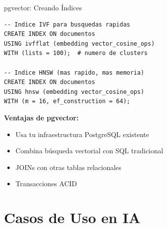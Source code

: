 \documentclass[aspectratio=169]{beamer}
\begin{document}
\begin{frame}[fragile]{pgvector: Creando Índices}
\begin{lstlisting}[style=sqlstyle]
-- Indice IVF para busquedas rapidas
CREATE INDEX ON documentos 
USING ivfflat (embedding vector_cosine_ops)
WITH (lists = 100);  # numero de clusters

-- Indice HNSW (mas rapido, mas memoria)
CREATE INDEX ON documentos 
USING hnsw (embedding vector_cosine_ops)
WITH (m = 16, ef_construction = 64);
\end{lstlisting}

\vspace{0.3cm}
\textbf{Ventajas de pgvector:}
\begin{itemize}
    \item Usa tu infraestructura PostgreSQL existente
    \item Combina búsqueda vectorial con SQL tradicional
    \item JOINs con otras tablas relacionales
    \item Transacciones ACID
\end{itemize}
\end{frame}



\section{Casos de Uso en IA}
\end{document}
